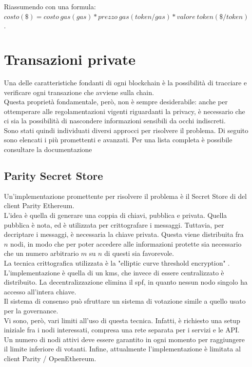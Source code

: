 \documentclass[12pt, letterpaper, twoside]{article}
\begin{document}
Riassumendo con una formula: \\
$ costo(\$) = costo\ gas(gas) * prezzo\ gas(token/gas) * valore\ token (\$/token) $. \\
 
\newpage
 
\section{Transazioni private}
Una delle caratteristiche fondanti di ogni blockchain è la possibilità di tracciare e verificare ogni transazione che avviene sulla chain. \\
Questa proprietà fondamentale, però, non è sempre desiderabile: anche per ottemperare alle regolamentazioni vigenti riguardanti la privacy, è necessario che ci sia la possibilità di nascondere informazioni sensibili da occhi indiscreti. \\
Sono stati quindi individuati diversi approcci per risolvere il problema. 
Di seguito sono elencati i più promettenti e avanzati.
Per una lista completa è possibile consultare la documentazione \cite{wiki:ew-privacy}
 
\subsection{Parity Secret Store}
Un'implementazione promettente per risolvere il problema è il Secret Store di del client Parity Ethereum. \\
L'idea è quella di generare una coppia di chiavi, pubblica e privata. 
Quella pubblica è nota, ed è utilizzata per crittografare i messaggi.
Tuttavia, per decriptare i messaggi, è necessaria la chiave privata.
Questa viene distribuita fra $n$ nodi, in modo che per poter accedere alle informazioni protette sia necessario che un numero arbitrario $m$ su $n$ di questi sia favorevole. \\
La tecnica crittografica utilizzata è la "elliptic curve threshold encryption" \cite{art:ecdkg}. \\
L'implementazione è quella di un \gls{kms}, che invece di essere centralizzato è distribuito.
La decentralizzazione elimina il \gls{spf}, in quanto nessun nodo singolo ha accesso all'intera chiave. \\
Il sistema di consenso può sfruttare un sistema di votazione simile a quello usato per la governance. \\
Vi sono, però, vari limiti all'uso di questa tecnica. 
Infatti, è richiesto una setup iniziale fra i nodi interessati, compresa una rete separata per i servizi e le API.
Un numero di nodi attivi deve essere garantito in ogni momento per raggiungere il limite inferiore di votanti.
Infine, attualmente l'implementazione è limitata al client Parity / OpenEthereum.
 
\end{document}
